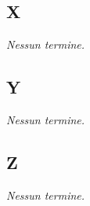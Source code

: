 {}
\subsection*{X}
\textit{Nessun termine.}

{}
\subsection*{Y}
\textit{Nessun termine.}

{}
\subsection*{Z}
\textit{Nessun termine.}
